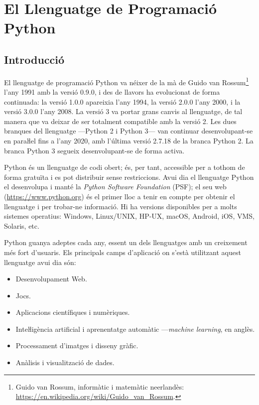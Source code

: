 
\chapter{El Llenguatge de Programació Python}\label{chap:python-llenguatge}


\section{Introducció}

El llenguatge de programació Python va néixer de la mà de Guido van Rossum\footnote{Guido van Rossum, informàtic i matemàtic neerlandès: \href{https://en.wikipedia.org/wiki/Guido_van_Rossum}{https:/\!\!/en.wikipedia.org/wiki/Guido\_van\_Rossum}.} l'any 1991 amb la versió 0.9.0, i des de llavors  ha evolucionat de forma continuada: la versió 1.0.0 apareixia l'any 1994, la versió 2.0.0 l'any 2000, i la versió 3.0.0 l'any 2008. La versió 3 va portar grans canvis al llenguatge, de tal manera que va deixar de ser totalment compatible amb la versió 2. Les dues branques del llenguatge ---Python 2 i Python 3--- van continuar desenvolupant-se en paraŀlel fins a l'any 2020, amb l'última versió  2.7.18  de la branca Python 2. La branca Python 3 segueix desenvolupant-se de forma activa.


Python és un llenguatge de codi obert; és, per tant, accessible per a tothom de forma gratuïta i  es pot distribuir sense restriccions.  Avui  dia el llenguatge Python el desenvolupa i manté la \textit{Python Software Foundation} (PSF); el seu web (\href{https://www.python.org/}{https:/\!\!/www.python.org}) és el primer lloc a tenir en compte per obtenir el llenguatge i per trobar-ne informació. Hi ha versions disponibles per a molts sistemes operatius: Windows, Linux/UNIX, HP-UX, macOS, Android, iOS, VMS, Solaris, etc.

Python guanya adeptes cada any, essent un dels llenguatges amb un creixement més fort d'usuaris. Els principals camps d'aplicació on s'està utilitzant aquest llenguatge avui dia són:
\begin{itemize}
	\item Desenvolupament Web.
	\item Jocs.
	\item Aplicacions científiques i numèriques.
	\item Inteŀligència artificial i aprenentatge automàtic ---\textit{machine learning}, en anglès.
	\item Processament d'imatges i disseny gràfic.
	\item Anàlisis i visualització de dades.
\end{itemize}

